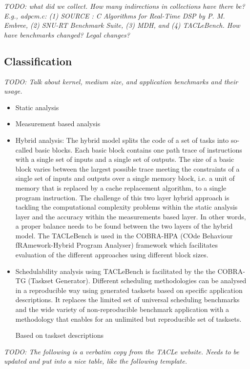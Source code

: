 \documentclass[a4paper,UKenglish]{oasics}
\newcommand{\todo}[1]{{\emph{TODO: #1}}}
\begin{document}
\todo{what did we collect. How many indirections in collections have there be?
E.g., adpcm.c: (1) SOURCE : C Algorithms for Real-Time DSP by P. M. Embree,
(2) SNU-RT Benchmark Suite, (3) MDH, and (4) TACLeBench. How have
benchmarks  changed? Legal changes?}

\subsection{Classification}

\todo{Talk about kernel, medium size, and application benchmarks and their usage.}
\begin{itemize}
\item Static analysis
\item Measurement based analysis
\item Hybrid analysis: The hybrid model splits the code of a set of tasks into so-
called basic blocks. Each basic block contains one path trace of instructions with a single set of inputs and a single set of outputs.  The  size  of  a  basic  block  varies  between  the  largest possible trace meeting the constraints of a single set of inputs and outputs over a single memory block, i.e. a unit of memory that is replaced by a cache replacement algorithm, to a single program instruction.
The  challenge  of  this  two  layer  hybrid  approach  is  tackling the computational complexity problems within the static analysis  layer  and  the  accuracy  within  the  measurements based  layer.  In  other  words,  a  proper  balance  needs  to  be found between the two layers of the hybrid model. The TACLeBench is used in the COBRA-HPA (COde Behaviour fRAmework-Hybrid Program Analyser) framework which facilitates evaluation of the different approaches using different block sizes.
\item Schedulability analysis using TACLeBench is facilitated by the the COBRA-TG (Taskset Generator). Different scheduling methodologies can be analysed in a reproducible way using generated tasksets based on specific application descriptions. It replaces the limited set of universal scheduling benchmarks and the wide variety of non-reproducible benchmark application with a methodology that enables for an unlimited but reproducible set of tasksets.

Based on taskset descriptions 
\end{itemize}

\todo{The following is a verbatim copy from the TACLe website.
Needs to be updated and put into a nice table, like the following template.}
\end{document}

